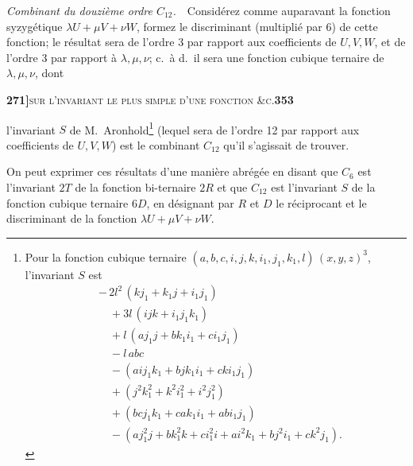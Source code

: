 \documentclass[11pt]{article}
\begin{document}
\medskip

\noindent\textit{Combinant du douzi\`eme ordre $C_{12}$.}\ \ Consid\'erez comme auparavant la fonction syzyg\'etique $\lambda U + \mu V + \nu W$, formez le discriminant (multipli\'e par 6) de cette fonction; le r\'esultat sera de l'ordre 3 par rapport aux coefficients de $U, V, W$, et de l'ordre 3 par rapport \`a $\lambda, \mu, \nu$; c.\ \`a d.\ il sera une fonction cubique ternaire de $\lambda, \mu, \nu$, dont

\newpage
\setcounter{page}{353}

\noindent\textbf{271]}\hfill\textsc{sur l'invariant le plus simple d'une fonction \&c.}\hfill\textbf{353}

\medskip

\noindent l'invariant $S$ de M.~Aronhold\footnote{Pour la fonction cubique ternaire $(a, b, c, i, j, k, i_1, j_1, k_1, l)\,(x, y, z)^3$, l'invariant $S$ est
\[
\begin{aligned}
   &-\,2 l^2\,(k j_1 + k_1 j + i_1 j_1)\\
   &\quad{} + 3 l\,(i j k + i_1 j_1 k_1)\\
   &\quad{} + l\,(a j_1 j + b k_1 i_1 + c i_1 j_1)\\
   &\quad{} - l\,a b c\\
   &\quad{} - (a i j_1 k_1 + b j k_1 i_1 + c k i_1 j_1)\\
   &\quad{} + (j^2 k_1^2 + k^2 i_1^2 + i^2 j_1^2)\\
   &\quad{} + (b c j_1 k_1 + c a k_1 i_1 + a b i_1 j_1)\\
   &\quad{} - (a j_1^2 j + b k_1^2 k + c i_1^2 i + a i^2 k_1 + b j^2 i_1 + c k^2 j_1).
\end{aligned}
\]
} (lequel sera de l'ordre 12 par rapport aux coefficients de $U, V, W$) est le combinant $C_{12}$ qu'il s'agissait de trouver.

\medskip

\noindent On peut exprimer ces r\'esultats d'une mani\`ere abr\'eg\'ee en disant que $C_6$ est l'invariant $2 T$ de la fonction bi-ternaire $2 R$ et que $C_{12}$ est l'invariant $S$ de la fonction cubique ternaire $6 D$, en d\'esignant par $R$ et $D$ le r\'eciprocant et le discriminant de la fonction $\lambda U + \mu V + \nu W$.

\medskip
\end{document}
